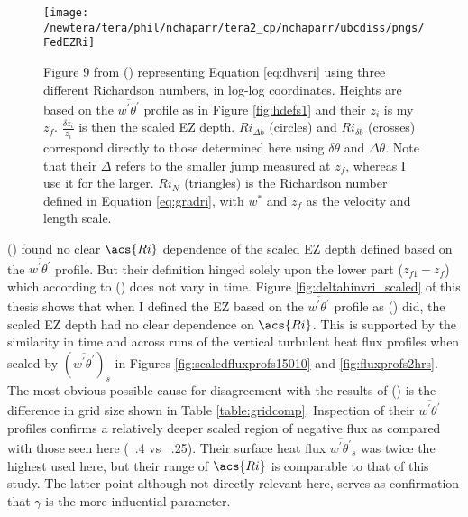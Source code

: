 \begin{figure}[htbp]
    \centering
    \texttt{[image: /newtera/tera/phil/nchaparr/tera2\_cp/nchaparr/ubcdiss/pngs/FedEZRi]}
    \caption[Plot of the relationship between scaled \acs{EZ} depth and Richardson number from \citeauthor{FedConzMir04}'s (\citeyear{FedConzMir04})]{Figure 9 from \citeauthor{FedConzMir04} (\citeyear{FedConzMir04}) representing Equation \ref{eq:dhvsri} using three different Richardson numbers, in log-log coordinates.  Heights are based on the $\overline{w^{'}\theta^{'}}$ profile as in Figure \ref{fig:hdefs1} and their $z_{i}$ is my $z_{f}$. $\frac{\delta z_{i}}{z_{i}}$ is then the scaled \acs{EZ} depth. $Ri_{\Delta b}$ (circles) and $Ri_{\delta b}$ (crosses) correspond directly to those determined here using $\delta \theta$ and $\Delta \theta$.  Note that their $\Delta$ refers to the smaller jump measured at $z_{f}$, whereas I use it for the larger.  $Ri_{N}$ (triangles) is the Richardson number defined in Equation \ref{eq:gradri}, with $w^{*}$ and $z_{f}$ as the velocity and length scale.}
    \label{fig:FedEZRi}   %
\end{figure}


 \citeauthor{BrooksFowler2} (\citeyear{BrooksFowler2}) found no clear $\acs{Ri}$ dependence of the scaled \acs{EZ} depth defined based on the $\overline{w^{'}\theta^{'}}$ profile.  But their definition hinged solely upon the lower part ($z_{f1} - z_{f}$) which according to \citeauthor{FedConzMir04} (\citeyear{FedConzMir04}) does not vary in time.  Figure \ref{fig:deltahinvri_scaled} of this thesis shows that when I defined the \acs{EZ} based on the $\overline{w^{'}\theta^{'}}$ profile as \citeauthor{FedConzMir04} (\citeyear{FedConzMir04}) did, the scaled \acs{EZ} depth had no clear dependence on $\acs{Ri}$. This is supported by the similarity in time and across runs of the vertical turbulent heat flux profiles when scaled by $(\overline{w^{'}\theta^{'}})_{s}$ in Figures \ref{fig:scaledfluxprofs15010} and \ref{fig:fluxprofs2hrs}.\\

The most obvious possible cause for disagreement with the results of \citeauthor{FedConzMir04} (\citeyear{FedConzMir04}) is the difference in grid size shown in Table \ref{table:gridcomp}.  Inspection of their $\overline{w^{'}\theta^{'}}$ profiles confirms a relatively deeper scaled region of negative flux as compared with those seen here (~.4 vs ~.25). Their surface heat flux $\overline{w^{'}\theta^{'}}_{s}$ was twice the highest used here, but their range of $\acs{Ri}$ is comparable to that of this study.  The latter point although not directly relevant here, serves as confirmation that $\gamma$ is the more influential parameter.\\              

